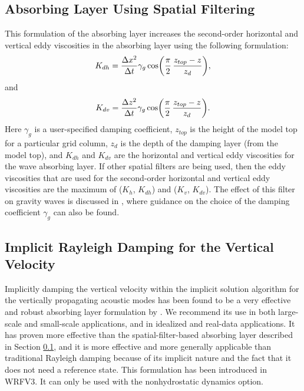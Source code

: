 \subsection{Absorbing Layer Using Spatial Filtering}
\label{absorbing_layer_spatial}

This formulation of the absorbing layer increases the second-order
horizontal and vertical eddy viscosities in the absorbing layer using
the following formulation:
%
\begin{equation}
K_{dh} = {\Delta x^2\over \Delta t} \gamma_g
\cos \biggl({\pi \over 2} \,{z_{top} - z \over z_{d}} \biggr),
\notag
\end{equation}
%
\noindent
and
%
\begin{equation}
K_{dv} = {\Delta z^2\over \Delta t} \gamma_g
\cos \biggl({\pi \over 2} \, {z_{top} - z \over z_{d}} \biggr).
\notag
\end{equation}
%
\noindent
Here $\gamma_g$ is a user-specified damping coefficient, $z_{top}$
is the height of the model top for a particular grid column, 
$z_d$ is the depth of the damping layer (from the model top), 
and $K_{dh}$ and $K_{dv}$ are the horizontal and vertical 
eddy viscosities for the wave absorbing layer.  If other 
spatial filters are being used, then the eddy viscosities
that are used for the second-order horizontal and vertical
eddy viscosities are the
maximum of ($K_h$, $K_{dh}$) and ($K_v$, $K_{dv}$).
The effect of this filter on gravity waves is discussed in
\citet{klemp_and_lilly78}, where guidance on the choice of 
the damping coefficient $\gamma_g$ can also be found.

\subsection{Implicit Rayleigh Damping for the Vertical Velocity}
\label{rayleigh-w}

Implicitly damping the vertical velocity within the implicit solution
algorithm for the vertically propagating acoustic modes has been found
to be a very effective and robust absorbing layer formulation by
\citet{klemp_et_al_2008}.  We recommend its use in both large-scale and
small-scale applications, and in idealized and real-data applications.
It has proven more effective than the spatial-filter-based absorbing
layer described in Section \ref{absorbing_layer_spatial}, and it is more
effective and more generally applicable than traditional Rayleigh
damping because of its implicit nature and the fact that it does not
need a reference state.  This formulation has been introduced in WRFV3.
It can only be used with the nonhydrostatic dynamics option.

